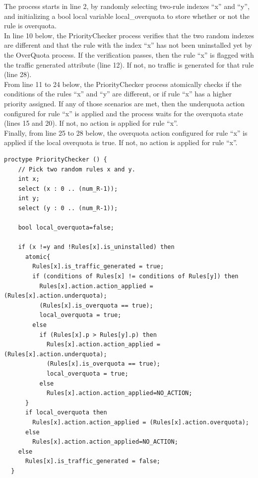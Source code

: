 The process starts in line 2, by randomly selecting two-rule indexes ``x'' and ``y'', and initializing a bool local variable local\_overquota to store whether or not the rule is overquota. \\

In line 10 below, the PriorityChecker process verifies that the two random indexes are different and  that the rule with the index ``x'' has not been uninstalled yet by the OverQuota process. If the verification passes, then the rule ``x'' is flagged with the traffic generated attribute (line 12). If not, no traffic is generated for that rule (line 28). \\

From line 11 to 24 below, the PriorityChecker process atomically checks if the conditions of the rules ``x'' and ``y'' are different, or if rule ``x'' has a higher priority assigned. If any of those scenarios are met, then the underquota action configured for rule ``x'' is applied and the process waits for the overquota state (lines 15 and 20). If not, no action is applied for rule ``x''. \\

Finally, from line 25 to 28 below, the overquota action configured for rule ``x'' is applied if the local overquota is true. If not, no action is applied for rule ``x''. 

\singlespacing
\begin{lstlisting}[caption=PriorityChecker high-level algorithm,
  label=lsl_prioritychecker]
  proctype PriorityChecker () {
    // Pick two random rules x and y.
    int x;
    select (x : 0 .. (num_R-1)); 
    int y;
    select (y : 0 .. (num_R-1)); 
  
    bool local_overquota=false;

    if (x !=y and !Rules[x].is_uninstalled) then 
      atomic{
        Rules[x].is_traffic_generated = true;  
        if (conditions of Rules[x] != conditions of Rules[y]) then
          Rules[x].action.action_applied = (Rules[x].action.underquota);
          (Rules[x].is_overquota == true);
          local_overquota = true;
        else
          if (Rules[x].p > Rules[y].p) then 
            Rules[x].action.action_applied = (Rules[x].action.underquota);
            (Rules[x].is_overquota == true);
            local_overquota = true;
          else
            Rules[x].action.action_applied=NO_ACTION;      
      }
      if local_overquota then 
        Rules[x].action.action_applied = (Rules[x].action.overquota);
      else
        Rules[x].action.action_applied=NO_ACTION; 
    else
      Rules[x].is_traffic_generated = false;  
  }    	
\end{lstlisting}
\doublespacing

